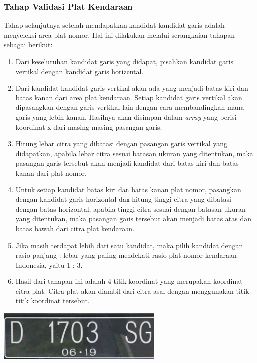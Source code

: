\subsubsection{Tahap Validasi Plat Kendaraan}
\noindent Tahap selanjutnya setelah mendapatkan kandidat-kandidat garis adalah menyeleksi area plat nomor. Hal ini dilakukan melalui serangkaian tahapan sebagai berikut:
\begin{enumerate}
	\item Dari keseluruhan kandidat garis yang didapat, pisahkan kandidat garis vertikal dengan kandidat garis horizontal.
	\item Dari kandidat-kandidat garis vertikal akan ada yang menjadi batas kiri dan batas kanan dari area plat kendaraan. Setiap kandidat garis vertikal akan dipasangkan dengan garis vertikal lain dengan cara membandingkan mana garis yang lebih kanan. Hasilnya akan disimpan dalam \textit{array} yang berisi koordinat x dari masing-masing pasangan garis.
	\item Hitung lebar citra yang dibatasi dengan pasangan garis vertikal yang didapatkan, apabila lebar citra sesuai batasan ukuran yang ditentukan, maka pasangan garis tersebut akan menjadi kandidat dari batas kiri dan batas kanan dari plat nomor.
	\item Untuk setiap kandidat batas kiri dan batas kanan plat nomor, pasangkan dengan kandidat garis horizontal dan hitung tinggi citra yang dibatasi dengan batas horizontal, apabila tinggi citra sesuai dengan batasan ukuran yang ditentukan, maka pasangan garis tersebut akan menjadi batas atas dan batas bawah dari citra plat kendaraan.
	\item Jika masih terdapat lebih dari satu kandidat, maka pilih kandidat dengan rasio panjang : lebar yang paling mendekati rasio plat nomor kendaraan Indonesia, yaitu 1 : 3.
	\item Hasil dari tahapan ini adalah 4 titik koordinat yang merupakan koordinat citra plat. Citra plat akan diambil dari citra asal dengan menggunakan titik-titik koordinat tersebut.
\end{enumerate}
\begin{adjustbox}{width=1\textwidth}
	\noindent\begin{minipage}{\linewidth}
		\centering\includegraphics[width=8cm]{images/HasilPlat.png}
		\label{fig:OutputPlat}
	\end{minipage}
\end{adjustbox}\\

